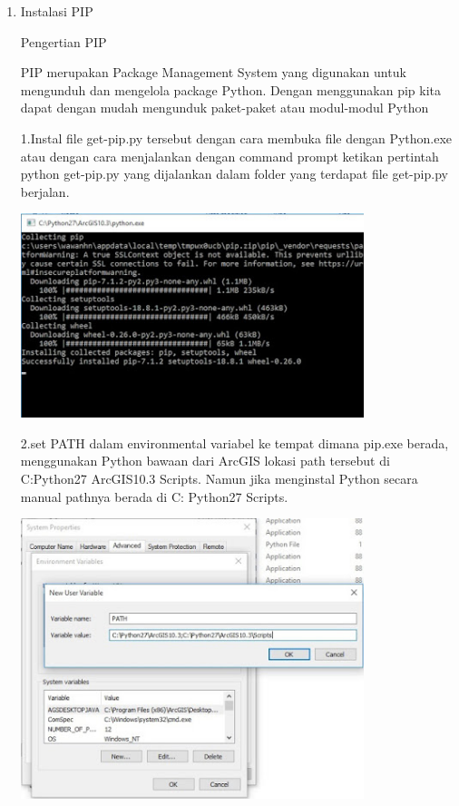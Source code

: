 \begin{enumerate}
      
    `\item Instalasi PIP
    
    Pengertian PIP
    
    PIP merupakan Package Management System yang digunakan untuk mengunduh dan mengelola package Python. Dengan menggunakan pip kita dapat dengan mudah mengunduk paket-paket atau modul-modul Python
        \begin{enumerate}
    1.Instal file get-pip.py tersebut dengan cara membuka file dengan Python.exe atau dengan cara menjalankan dengan command prompt ketikan pertintah python get-pip.py yang dijalankan dalam folder yang terdapat file get-pip.py berjalan.
    \begin{center}
            \includegraphics[width=10cm]{figures/pip1.jpg}
        \end{center}
    
    
    2.set PATH dalam environmental variabel ke tempat dimana pip.exe berada, menggunakan Python bawaan dari ArcGIS lokasi path tersebut di C:Python27 ArcGIS10.3 Scripts. Namun jika menginstal Python secara manual  pathnya berada di C: Python27 Scripts.
    \begin{center}
            \includegraphics[width=10cm]{figures/pip2.jpg}
        \end{center}
    

\end{enumerate}
\end{enumerate}
